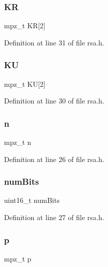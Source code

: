 \subsubsection{\texorpdfstring{KR}{KR}}
{\footnotesize\ttfamily mpz\+\_\+t KR\mbox{[}2\mbox{]}}



Definition at line 31 of file rsa.\+h.

\mbox{\label{structrsactx__t_a669520018df4fe14d2e2682ed3fb62fb}} 
\subsubsection{\texorpdfstring{KU}{KU}}
{\footnotesize\ttfamily mpz\+\_\+t KU\mbox{[}2\mbox{]}}



Definition at line 30 of file rsa.\+h.

\mbox{\label{structrsactx__t_a6202bb3ec0e257e04ba4ac9e9f6b92b0}} 
\subsubsection{\texorpdfstring{n}{n}}
{\footnotesize\ttfamily mpz\+\_\+t n}



Definition at line 26 of file rsa.\+h.

\mbox{\label{structrsactx__t_a07f83468c3d651766dd2a28e354ee294}} 
\subsubsection{\texorpdfstring{num\+Bits}{numBits}}
{\footnotesize\ttfamily uint16\+\_\+t num\+Bits}



Definition at line 27 of file rsa.\+h.

\mbox{\label{structrsactx__t_a0e4c86a571e946d9d6a5160989713989}} 
\subsubsection{\texorpdfstring{p}{p}}
{\footnotesize\ttfamily mpz\+\_\+t p}



